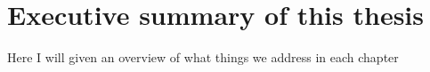 \section{Executive summary of this thesis}

Here I will given an overview of what things we address in each chapter